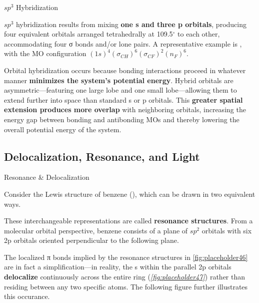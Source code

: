 \documentclass[10pt]{article}
\begin{document}
    \begin{core}{$sp^3$ Hybridization}

      $sp^3$ hybridization results from mixing \textbf{one s and three p orbitals}, producing four equivalent orbitals arranged tetrahedrally at 109.5$^\circ$ to each other, accommodating four σ bonds and/or lone pairs. A representative example is , with the MO configuration $(1s)^4(σ_{CH})^6(σ_{CF})^2(n_{F})^6$.


    \end{core}

    Orbital hybridization occurs because bonding interactions proceed in whatever manner \textbf{minimizes the system's potential energy}. Hybrid orbitals are asymmetric---featuring one large lobe and one small lobe---allowing them to extend further into space than standard s or p orbitals. This \textbf{greater spatial extension produces more overlap} with neighboring orbitals, increasing the energy gap between bonding and antibonding MOs and thereby lowering the overall potential energy of the system.

  \subsection{Delocalization, Resonance, and Light}

  \begin{core}[label=core:delocalization]{Resonance \& Delocalization}
        
      Consider the Lewis structure of benzene (), which can be drawn in two equivalent ways.


      These interchangeable representations are called \textbf{resonance structures}. From a molecular orbital perspective, benzene consists of a plane of $sp^2$ orbitals with six 2p orbitals oriented perpendicular to the following plane.


      The localized π bonds implied by the resonance structures in \autoref{fig:placeholder46} are in fact a simplification---in reality, the s within the parallel 2p orbitals \textbf{delocalize} continuously across the entire ring (\textit{\autoref{fig:placeholder47}}) rather than residing between any two specific atoms. The following figure further illustrates this occurance.


    \end{core}
\end{document}
